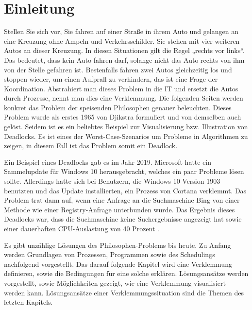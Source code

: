 \chapter{Einleitung}
\label{sec:Einleitung}
Stellen Sie sich vor, Sie fahren auf einer Straße in ihrem Auto und gelangen an eine Kreuzung ohne Ampeln und Verkehrsschilder. Sie stehen mit vier weiteren Autos an dieser Kreuzung. In diesen Situationen gilt die Regel „rechts vor links“. Das bedeutet, dass kein Auto fahren darf, solange nicht das Auto rechts von ihm von der Stelle gefahren ist. Bestenfalls fahren zwei Autos gleichzeitig los und stoppen wieder, um einen Aufprall zu verhindern, das ist eine Frage der Koordination.
Abstrahiert man dieses Problem in die IT und ersetzt die Autos durch Prozesse, nennt man dies eine Verklemmung.
Die folgenden Seiten werden konkret das Problem der speisenden Philosophen genauer beleuchten.
Dieses Problem wurde als erstes 1965 von Djikstra formuliert und von demselben auch gelöst. Seidem ist es ein beliebtes Beispiel zur Visualisierung bzw. Illustration von Deadlocks. Es ist eines der Worst-Case-Szenarios um Probleme in Algorithmen zu zeigen, in diesem Fall ist das Problem somit ein Deadlock.

Ein Beispiel eines Deadlocks gab es im Jahr 2019. Microsoft hatte ein Sammelupdate für Windows 10 herausgebracht, welches ein paar Probleme lösen sollte. Allerdings hatte sich bei Benutzern, die Windows 10 Version 1903 benutzten und das Update installierten, ein Prozess von Cortana verklemmt. Das Problem trat dann auf, wenn eine Anfrage an die Suchmaschine Bing von einer Methode wie einer Registry-Anfrage unterbunden wurde. Das Ergebnis dieses Deadlocks war, dass die Suchmaschine keine Suchergebnisse angezeigt hat sowie einer dauerhaften CPU-Auslastung von 40 Prozent \parencite[vgl.][]{bug}.

Es gibt unzählige Lösungen des Philosophen-Problems bis heute. 
Zu Anfang werden Grundlagen von Prozessen, Programmen sowie des Schedulings nachfolgend vorgestellt. Das darauf folgende Kapitel wird eine Verklemmung definieren, sowie die Bedingungen für eine solche erklären. 
Lösungsansätze werden vorgestellt, sowie Möglichkeiten gezeigt, wie eine Verklemmung visualisiert werden kann. Lösungsansätze einer Verklemmungssituation sind die Themen des letzten Kapitels.